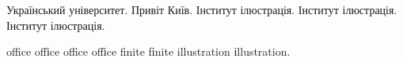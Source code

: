 \documentclass[10pt]{article}
\begin{document}
\noindent\parbox{65pt}{Український університет. Привіт Київ. Інститут ілюстрація.
Інститут ілюстрація. Інститут ілюстрація.}\par
{}
\selectfont
{}
\noindent\parbox{38pt}{office offіce office offіce finite fіnite illustration іllustration.}\par
\end{document}
